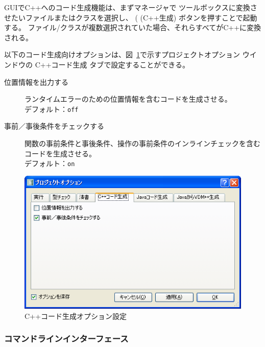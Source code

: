 \documentclass[\pformat,12pt]{jarticle}
\newcommand{\guicmd}[1]{{\gt #1}}
\begin{document}
GUIでC++へのコード生成機能は、まずマネージャで
ツールボックスに変換させたいファイルまたはクラスを選択し、 
(
(\guicmd{C++生成}) ボタンを押すことで起動する。
ファイル/クラスが複数選択されていた場合、それらすべてがC++に変換される。

以下のコード生成向けオプションは、図~\ref{fig:optccg}で示す\guicmd{プロジェクトオプション} ウインドウの
\guicmd{C++コード生成} タブで設定することができる。

\begin{description}


\item[位置情報を出力する]
  ランタイムエラーのための位置情報を含むコードを生成させる。 \\
  デフォルト：\texttt{off}
\item[事前／事後条件をチェックする]
  関数の事前条件と事後条件、操作の事前条件のインラインチェックを含むコードを生成させる。 \\
  デフォルト：\texttt{on}

\end{description}

\begin{figure}[tbh]
\begin{center}
\includegraphics[width=12cm]{ccgOptions-pp.png}
\caption{C++コード生成オプション設定}
\label{fig:optccg}
\end{center}
\end{figure}

\subsubsection{コマンドラインインターフェース}
\end{document}
